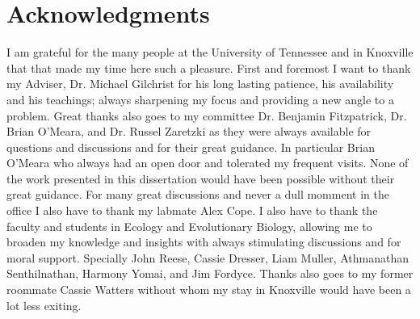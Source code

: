 \chapter*{Acknowledgments}
I am grateful for the many people at the University of Tennessee and in Knoxville that that made my time here such a pleasure.
First and foremost I want to thank my Adviser, Dr. Michael Gilchrist for his long lasting patience, his availability and his teachings;
always sharpening my focus and providing a new angle to a problem.
Great thanks also goes to my committee Dr. Benjamin Fitzpatrick, Dr. Brian O'Meara, and Dr. Russel Zaretzki as they were always available for questions and discussions and for their great guidance.
In particular Brian O'Meara who always had an open door and tolerated my frequent visits.
None of the work presented in this dissertation would have been possible without their great guidance.
For many great discussions and never a dull momment in the office I also have to thank my labmate Alex Cope.
I also have to thank the faculty and students in Ecology and Evolutionary Biology, allowing me to broaden my knowledge and insights with always stimulating discussions and for moral support.
Specially John Reese, Cassie Dresser, Liam Muller, Athmanathan Senthilnathan, Harmony Yomai, and Jim Fordyce.
Thanks also goes to my former roommate Cassie Watters without whom my stay in Knoxville would have been a lot less exiting.
